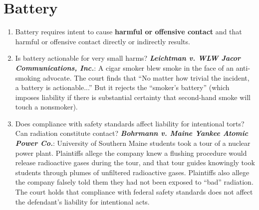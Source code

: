 \section{Battery}

\begin{enumerate}
    \item Battery requires intent to cause \textbf{harmful or offensive contact} and that harmful or offensive contact directly or indirectly results.
    \item Is battery actionable for very small harms? \textbf{\emph{Leichtman v. WLW Jacor Communications, Inc.}}: A cigar smoker blew smoke in the face of an anti-smoking advocate. The court finds that ``No matter how trivial the incident, a battery is actionable...'' But it rejects the ``smoker's battery'' (which imposes liability if there is substantial certainty that second-hand smoke will touch a nonsmoker).
    \item Does compliance with safety standards affect liability for intentional torts? Can radiation constitute contact? \textbf{\emph{Bohrmann v. Maine Yankee Atomic Power Co.}}: University of Southern Maine students took a tour of a nuclear power plant. Plaintiffs allege the company knew a flushing procedure would release radioactive gases during the tour, and that tour guides knowingly took students through plumes of unfiltered radioactive gases. Plaintiffs also allege the company falsely told them they had not been exposed to ``bad'' radiation. The court holds that compliance with federal safety standards does not affect the defendant's liability for intentional acts.
\end{enumerate}
